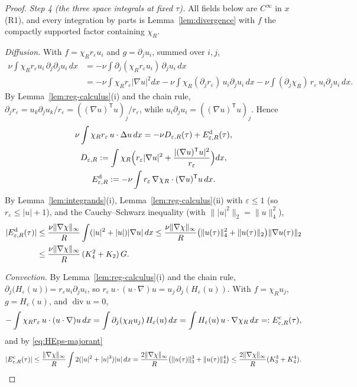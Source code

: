 \documentclass[11pt]{article}
\theoremstyle{definition}
\theoremstyle{plain}
\newcommand{\norm}[1]{\lVert #1\rVert}
\begin{document}
\begin{proof}
\emph{Step 4 (the three space integrals at fixed $\tau$).}  All fields
below are $C^\infty$ in $x$ (R1), and every integration by parts is
Lemma~\ref{lem:divergence} with $f$ the compactly supported factor
containing $\chi_R$.

\emph{Diffusion.}  With $f=\chi_Rr_\varepsilon u_i$ and $g=\partial_ju_i$,
summed over $i,j$,
\[
\begin{aligned}
 \nu\int\chi_Rr_\varepsilon u_i\,\partial_j\partial_ju_i\,dx
 &=-\nu\int\partial_j(\chi_Rr_\varepsilon u_i)\,\partial_ju_i\,dx\\
 &=-\nu\int\chi_Rr_\varepsilon|\nabla u|^2dx
  -\nu\int\chi_R(\partial_jr_\varepsilon)\,u_i\partial_ju_i\,dx
  -\nu\int(\partial_j\chi_R)\,r_\varepsilon\,u_i\partial_ju_i\,dx .
\end{aligned}
\]
By Lemma~\ref{lem:reg-calculus}(i) and the chain rule,
$\partial_jr_\varepsilon=u_k\partial_ju_k/r_\varepsilon
=((\nabla u)^{\mathsf T}u)_j/r_\varepsilon$, while
$u_i\partial_ju_i=((\nabla u)^{\mathsf T}u)_j$.  Hence
\[
\begin{gathered}
 \nu\int\chi_Rr_\varepsilon\,u\cdot\Delta u\,dx
 =-\nu D_{\varepsilon,R}(\tau)+E^{\rm d}_{\varepsilon,R}(\tau),\\
 D_{\varepsilon,R}:=\int\chi_R\Bigl(r_\varepsilon|\nabla u|^2
 +\frac{|(\nabla u)^{\mathsf T}u|^2}{r_\varepsilon}\Bigr)dx,\\
 E^{\rm d}_{\varepsilon,R}:=-\nu\int r_\varepsilon\,\nabla\chi_R\cdot(\nabla u)^{\mathsf T}u\,dx .
\end{gathered}
\]
By Lemma~\ref{lem:integrands}(i), Lemma~\ref{lem:reg-calculus}(ii) with
$\varepsilon\leq1$ (so $r_\varepsilon\leq|u|+1$), and the Cauchy--Schwarz
inequality (with $\norm{|u|^2}_2=\norm u_4^2$),
\[
\begin{aligned}
 |E^{\rm d}_{\varepsilon,R}(\tau)|
 &\leq\frac{\nu\norm{\nabla\chi}_\infty}{R}\int(|u|^2+|u|)|\nabla u|\,dx
 \leq\frac{\nu\norm{\nabla\chi}_\infty}{R}
 \bigl(\norm{u(\tau)}_4^2+\norm{u(\tau)}_2\bigr)\norm{\nabla u(\tau)}_2\\
 &\leq\frac{\nu\norm{\nabla\chi}_\infty}{R}\,(K_4^2+K_2)\,G .
\end{aligned}
\]

\emph{Convection.}  By Lemma~\ref{lem:reg-calculus}(i) and the chain rule,
$\partial_j\bigl(H_\varepsilon(u)\bigr)=r_\varepsilon u_i\partial_ju_i$, so
$r_\varepsilon\,u\cdot(u\cdot\nabla)u=u_j\,\partial_j(H_\varepsilon(u))$.
With $f=\chi_Ru_j$, $g=H_\varepsilon(u)$, and $\operatorname{div}u=0$,
\[
 -\int\chi_Rr_\varepsilon\,u\cdot(u\cdot\nabla)u\,dx
 =\int\partial_j(\chi_Ru_j)\,H_\varepsilon(u)\,dx
 =\int H_\varepsilon(u)\,u\cdot\nabla\chi_R\,dx
 =:E^{\rm c}_{\varepsilon,R}(\tau),
\]
and by \eqref{eq:HEps-majorant}
\[
 |E^{\rm c}_{\varepsilon,R}(\tau)|
 \leq\frac{\norm{\nabla\chi}_\infty}{R}\int2(|u|^2+|u|^3)|u|\,dx
 =\frac{2\norm{\nabla\chi}_\infty}{R}\bigl(\norm{u(\tau)}_3^3+\norm{u(\tau)}_4^4\bigr)
 \leq\frac{2\norm{\nabla\chi}_\infty}{R}(K_3^3+K_4^4).
\]


\end{proof}
\end{document}
